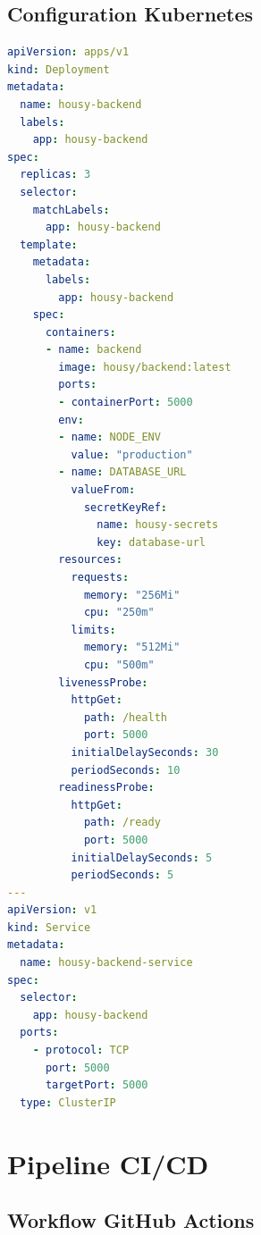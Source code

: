 \subsection{Configuration Kubernetes}

\begin{lstlisting}[language=yaml, caption=Déploiement Kubernetes]
apiVersion: apps/v1
kind: Deployment
metadata:
  name: housy-backend
  labels:
    app: housy-backend
spec:
  replicas: 3
  selector:
    matchLabels:
      app: housy-backend
  template:
    metadata:
      labels:
        app: housy-backend
    spec:
      containers:
      - name: backend
        image: housy/backend:latest
        ports:
        - containerPort: 5000
        env:
        - name: NODE_ENV
          value: "production"
        - name: DATABASE_URL
          valueFrom:
            secretKeyRef:
              name: housy-secrets
              key: database-url
        resources:
          requests:
            memory: "256Mi"
            cpu: "250m"
          limits:
            memory: "512Mi"
            cpu: "500m"
        livenessProbe:
          httpGet:
            path: /health
            port: 5000
          initialDelaySeconds: 30
          periodSeconds: 10
        readinessProbe:
          httpGet:
            path: /ready
            port: 5000
          initialDelaySeconds: 5
          periodSeconds: 5
---
apiVersion: v1
kind: Service
metadata:
  name: housy-backend-service
spec:
  selector:
    app: housy-backend
  ports:
    - protocol: TCP
      port: 5000
      targetPort: 5000
  type: ClusterIP
\end{lstlisting}

\section{Pipeline CI/CD}

\subsection{Workflow GitHub Actions}

